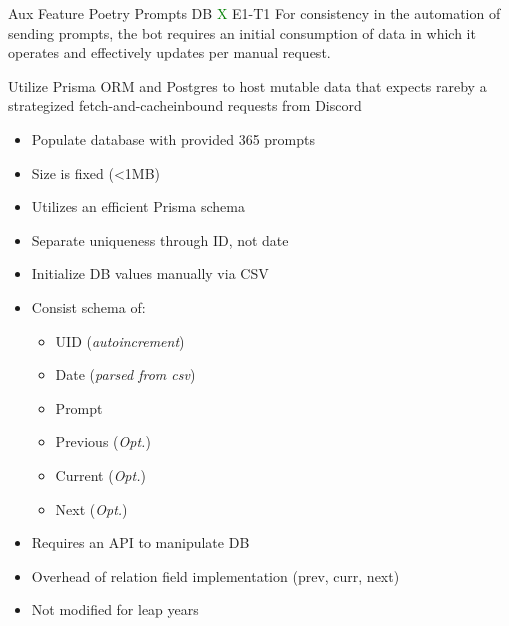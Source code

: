 \documentclass[7px]{article}
\begin{document}
\frontmatter
{Aux Feature}
{Poetry Prompts DB}
{\textcolor{green}{X}}
{E1-T1}
{For consistency in the automation of sending prompts, the bot requires an initial consumption of data in which it operates and effectively updates per manual request.}

\strategy
{
  Utilize Prisma ORM and Postgres to host mutable data that expects rare{\textemdash}by a strategized fetch-and-cache{\textemdash}inbound requests from Discord
}
{
  \begin{enumerate}
    \small
    \begin{itemize}[label=$\multimapdotinv$, leftmargin=1.7mm]
      \item Populate database with provided 365 prompts
      \item Size is fixed (<1MB)
      \item Utilizes an efficient Prisma schema
      \item Separate uniqueness through ID, not date
    \end{itemize}
    \normalsize
\end{enumerate}
}
{
  \small
  \begin{itemize}[label=$\multimapdotinv$]
    \item Initialize DB values manually via CSV
    \item Consist schema of:
      \footnotesize{
        \begin{itemize}[label=\bullet]
          \item UID (\textit{autoincrement})
          \item Date (\textit{parsed from csv})
          \item Prompt
          \item Previous (\textit{Opt.})
          \item Current (\textit{Opt.})
          \item Next (\textit{Opt.})
        \end{itemize}
      }
  \end{itemize}
  \normalsize
}
{
  \small
  \begin{itemize}[label=\opentimes]
    \item Requires an API to manipulate DB
    \item Overhead of relation field implementation (prev, curr, next)
    \item Not modified for leap years
  \end{itemize}
  \normalsize
}
\end{document}
